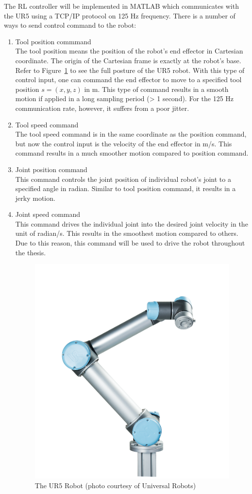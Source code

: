 The \ac {RL} controller will be implemented in MATLAB which communicates with the UR5 using a TCP/IP protocol on 125 Hz frequency. There is a number of ways to send control command to the robot:
\begin{enumerate}
\item Tool position commmand \\
The tool position means the position of the robot's end effector in Cartesian coordinate. The origin of the Cartesian frame is exactly at the robot's base. Refer to Figure~\ref{fig:UR5_Robot01} to see the full posture of the UR5 robot. With this type of control input, one can command the end effector to move to a specified tool position $ s = (x, y, z) $ in m. This type of command results in a smooth motion if applied in a long sampling period (> 1 second). For the 125 Hz communication rate, however, it suffers from a poor jitter.

\item Tool speed command \\
The tool speed command is in the same coordinate as the position command, but now the control input is the velocity of the end effector in m/s. This command results in a much smoother motion compared to position command.

\item Joint position command \\
This command controls the joint position of individual robot's joint to a specified angle in radian. Similar to tool position command, it results in a jerky motion. 

\item Joint speed command \\
This command drives the individual joint into the desired joint velocity in the unit of radian/s. This results in the smoothest motion compared to others. Due to this reason, this command will be used to drive the robot throughout the thesis.

\begin{figure}
\centering
\includegraphics[width=0.5\linewidth]{UR5_Robot01}
\caption{The UR5 Robot (photo courtesy of Universal Robots)}
\label{fig:UR5_Robot01}
\end{figure}
 
\end{enumerate}


